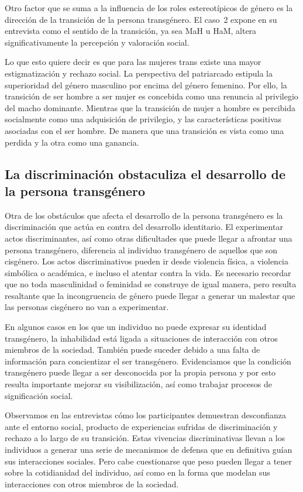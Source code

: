 Otro factor que se suma a la influencia de los roles estereotípicos de género es
la dirección de la transición de la persona transgénero. El caso~2 expone en su
entrevista como el sentido de la transición, ya sea MaH u HaM, altera
significativamente la percepción y valoración social.

Lo que esto quiere decir es que para las mujeres trans existe una mayor
estigmatización y rechazo social. La perspectiva del patriarcado estipula la
superioridad del género masculino por encima del género femenino. Por ello, la
transición de ser hombre a ser mujer es concebida como una renuncia al
privilegio del macho dominante. Mientras que la transición de mujer a hombre es
percibida socialmente como una adquisición de privilegio, y las características
positivas asociadas con el ser hombre. De manera que una transición es vista
como una perdida y la otra como una ganancia.

\subsection{La discriminación obstaculiza el desarrollo de la persona transgénero}

Otra de los obstáculos que afecta el desarrollo de la persona transgénero es la
discriminación que actúa en contra del desarrollo identitario. El experimentar
actos discriminantes, así como otras dificultades que puede llegar a afrontar
una persona transgénero, diferencia al individuo transgénero de aquellos que son
cisgénero. Los actos discriminativos pueden ir desde violencia física, a
violencia simbólica o académica, e incluso el atentar contra la vida. Es
necesario recordar que no toda masculinidad o feminidad se construye de igual
manera, pero resulta resaltante que la incongruencia de género puede llegar a
generar un malestar que las personas cisgénero no van a experimentar.

En algunos casos en los que un individuo no puede expresar su identidad
transgénero, la inhabilidad está ligada a situaciones de interacción con otros
miembros de la sociedad. También puede suceder debido a una falta de información
para concientizar el ser transgénero. Evidenciamos que la condición transgénero
puede llegar a ser desconocida por la propia persona y por esto resulta
importante mejorar su visibilización, así como trabajar procesos de significación
social.

Observamos en las entrevistas cómo los participantes demuestran desconfianza
ante el entorno social, producto de experiencias sufridas de discriminación y
rechazo a lo largo de su transición. Estas vivencias discriminativas llevan a
los individuos a generar una serie de mecanismos de defensa que en definitiva
guían sus interacciones sociales. Pero cabe cuestionarse que peso pueden
llegar a tener sobre la cotidianidad del individuo, así como en la forma que
modelan sus interacciones con otros miembros de la sociedad.


